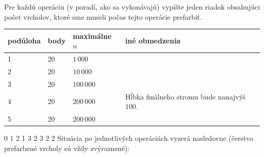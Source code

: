 
Pre každú operáciu (v poradí, ako sa vykonávajú) vypíšte jeden riadok obsahujúci počet vrcholov, ktoré
sme museli počas tejto operácie prefarbiť.


\begin{center}
\begin{tabular}{|l|l|l|l|}
\hline
podúloha & body & maximálne $n$ & iné obmedzenia                  \\ \hline
1       & 20     & $1\,000$      &                                        \\ \hline
2       & 20     & $10\,000$     &                                        \\ \hline
3       & 20     & $100\,000$     &                                        \\ \hline
4       & 20     & $200\,000$    & Hĺbka finálneho stromu bude nanajvýš $100$. \\ \hline
5       & 20     & $200\,000$    &                                        \\ \hline
\end{tabular}
\end{center}



0
1
2
1
3
2
3
2
2
\sampleCOMMENT
Situácia po jednotlivých operáciách vyzerá nasledovne (čerstvo prefarbené vrcholy sú vždy zvýraznené):
\sampleEND
{}

